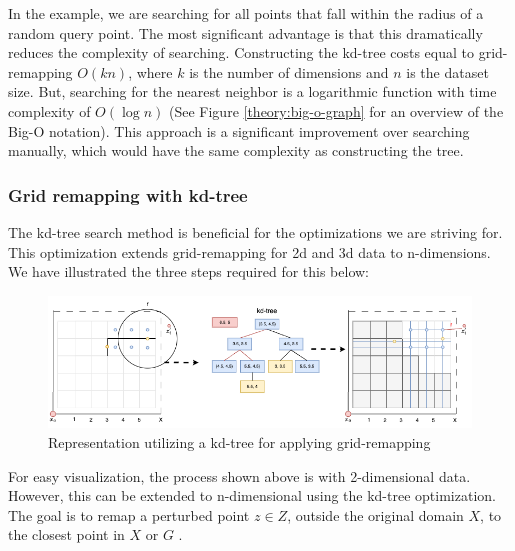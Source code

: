 In the example, we are searching for all points that fall within the radius of a random query point.
The most significant advantage is that this dramatically reduces the complexity of searching.
Constructing the kd-tree costs equal to grid-remapping $O(kn)$, where $k$ is the number of dimensions and $n$ is the dataset size.
But, searching for the nearest neighbor is a logarithmic function with time complexity of $O(\log n)$ \citep{washington_k-d_2002} (See Figure \ref{theory:big-o-graph} for an overview of the Big-O notation).
This approach is a significant improvement over searching manually, which would have the same complexity as constructing the tree.

\subsubsection{Grid remapping with kd-tree} \label{theory:grid-remapping}
The kd-tree search method is beneficial for the optimizations we are striving for.
This optimization extends grid-remapping for 2d \citep{DBLP:journals/corr/abs-1212-1984} and 3d data \citep{9646489} to n-dimensions. \newline
We have illustrated the three steps required for this below:
\begin{figure}[H]
  \includegraphics[width=1\textwidth]{TheorethicalFramework/ND-Laplace/Images/KD-tree.png}
  \caption{Representation utilizing a kd-tree for applying grid-remapping \citep{DBLP:journals/corr/abs-1212-1984}}
  \label{fig:kd-tree}
\end{figure}
For easy visualization, the process shown above is with 2-dimensional data.
However, this can be extended to n-dimensional using the kd-tree optimization.
The goal is to remap a perturbed point $z \in Z$, outside the original domain $X$, to the closest point in $X$ or $G$ \citep{DBLP:journals/corr/abs-1212-1984}.

